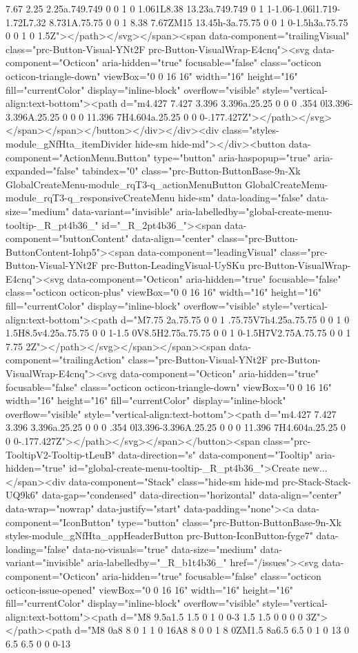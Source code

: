 7.67 2.25 2.25a.749.749 0 0 1 0 1.061L8.38 13.23a.749.749 0 1 1-1.06-1.06l1.719-1.72L7.32 8.731A.75.75 0 0 1 8.38 7.67ZM15 13.45h-3a.75.75 0 0 1 0-1.5h3a.75.75 0 0 1 0 1.5Z"></path></svg></span><span data-component="trailingVisual" class="prc-Button-Visual-YNt2F prc-Button-VisualWrap-E4cnq"><svg data-component="Octicon" aria-hidden="true" focusable="false" class="octicon octicon-triangle-down" viewBox="0 0 16 16" width="16" height="16" fill="currentColor" display="inline-block" overflow="visible" style="vertical-align:text-bottom"><path d="m4.427 7.427 3.396 3.396a.25.25 0 0 0 .354 0l3.396-3.396A.25.25 0 0 0 11.396 7H4.604a.25.25 0 0 0-.177.427Z"></path></svg></span></span></button></div></div><div class="styles-module_gNfHta_itemDivider hide-sm hide-md"></div><button data-component="ActionMenu.Button" type="button" aria-haspopup="true" aria-expanded="false" tabindex="0" class="prc-Button-ButtonBase-9n-Xk GlobalCreateMenu-module_rqT3-q_actionMenuButton GlobalCreateMenu-module_rqT3-q_responsiveCreateMenu hide-sm" data-loading="false" data-size="medium" data-variant="invisible" aria-labelledby="global-create-menu-tooltip-_R_pt4b36_" id="_R_2pt4b36_"><span data-component="buttonContent" data-align="center" class="prc-Button-ButtonContent-Iohp5"><span data-component="leadingVisual" class="prc-Button-Visual-YNt2F prc-Button-LeadingVisual-UySKu prc-Button-VisualWrap-E4cnq"><svg data-component="Octicon" aria-hidden="true" focusable="false" class="octicon octicon-plus" viewBox="0 0 16 16" width="16" height="16" fill="currentColor" display="inline-block" overflow="visible" style="vertical-align:text-bottom"><path d="M7.75 2a.75.75 0 0 1 .75.75V7h4.25a.75.75 0 0 1 0 1.5H8.5v4.25a.75.75 0 0 1-1.5 0V8.5H2.75a.75.75 0 0 1 0-1.5H7V2.75A.75.75 0 0 1 7.75 2Z"></path></svg></span></span><span data-component="trailingAction" class="prc-Button-Visual-YNt2F prc-Button-VisualWrap-E4cnq"><svg data-component="Octicon" aria-hidden="true" focusable="false" class="octicon octicon-triangle-down" viewBox="0 0 16 16" width="16" height="16" fill="currentColor" display="inline-block" overflow="visible" style="vertical-align:text-bottom"><path d="m4.427 7.427 3.396 3.396a.25.25 0 0 0 .354 0l3.396-3.396A.25.25 0 0 0 11.396 7H4.604a.25.25 0 0 0-.177.427Z"></path></svg></span></button><span class="prc-TooltipV2-Tooltip-tLeuB" data-direction="s" data-component="Tooltip" aria-hidden="true" id="global-create-menu-tooltip-_R_pt4b36_">Create new...</span><div data-component="Stack" class="hide-sm hide-md prc-Stack-Stack-UQ9k6" data-gap="condensed" data-direction="horizontal" data-align="center" data-wrap="nowrap" data-justify="start" data-padding="none"><a data-component="IconButton" type="button" class="prc-Button-ButtonBase-9n-Xk styles-module_gNfHta_appHeaderButton prc-Button-IconButton-fyge7" data-loading="false" data-no-visuals="true" data-size="medium" data-variant="invisible" aria-labelledby="_R_b1t4b36_" href="/issues"><svg data-component="Octicon" aria-hidden="true" focusable="false" class="octicon octicon-issue-opened" viewBox="0 0 16 16" width="16" height="16" fill="currentColor" display="inline-block" overflow="visible" style="vertical-align:text-bottom"><path d="M8 9.5a1.5 1.5 0 1 0 0-3 1.5 1.5 0 0 0 0 3Z"></path><path d="M8 0a8 8 0 1 1 0 16A8 8 0 0 1 8 0ZM1.5 8a6.5 6.5 0 1 0 13 0 6.5 6.5 0 0 0-13 